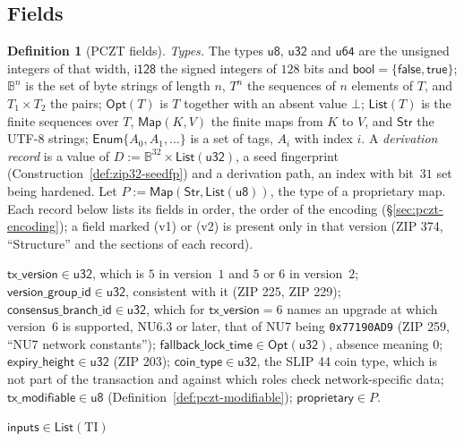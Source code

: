 \documentclass[11pt,a4paper]{article}
\theoremstyle{definition}
\newtheorem{definition}[theorem]{Definition}
\begin{document}
\subsection{Fields}\label{sec:pczt-fields}

\begin{definition}[PCZT fields]\label{def:pczt-fields}
\emph{Types.} The types $\mathsf{u8}$, $\mathsf{u32}$ and $\mathsf{u64}$
are the unsigned integers of that width, $\mathsf{i128}$ the signed
integers of $128$ bits and $\mathsf{bool} = \{\mathsf{false},
\mathsf{true}\}$; $\mathbb{B}^{n}$ is the set of byte strings of length $n$,
$T^{n}$ the sequences of $n$ elements of $T$, and $T_1 \times T_2$ the
pairs; $\mathsf{Opt}(T)$ is $T$ together with an absent value $\bot$;
$\mathsf{List}(T)$ is the finite sequences over $T$, $\mathsf{Map}(K, V)$
the finite maps from $K$ to $V$, and $\mathsf{Str}$ the UTF-8 strings;
$\mathsf{Enum}\{A_0, A_1, \dots\}$ is a set of tags, $A_i$ with index $i$. A
\emph{derivation record} is a value of $D := \mathbb{B}^{32} \times
\mathsf{List}(\mathsf{u32})$, a seed fingerprint
(Construction~\ref{def:zip32-seedfp}) and a derivation path, an index with
bit~$31$ set being hardened. Let $P := \mathsf{Map}(\mathsf{Str},
\mathsf{List}(\mathsf{u8}))$, the type of a proprietary map. Each record
below lists its fields in order, the order of the encoding
(\S\ref{sec:pczt-encoding}); a field marked (v1) or (v2) is present only in
that version (ZIP 374, ``Structure'' and the sections of each record).
{\raggedright
\begin{description}[leftmargin=0pt, itemsep=2pt]
\item[Global.] $\mathsf{tx\_version} \in \mathsf{u32}$, which is $5$ in
  version~$1$ and $5$ or $6$ in version~$2$;
  $\mathsf{version\_group\_id} \in \mathsf{u32}$, consistent with it (ZIP
  225, ZIP 229); $\mathsf{consensus\_branch\_id} \in \mathsf{u32}$, which
  for $\mathsf{tx\_version} = 6$ names an upgrade at which version~$6$ is
  supported, NU6.3 or later, that of NU7 being \texttt{0x77190AD9} (ZIP 259,
  ``NU7 network constants''); $\mathsf{fallback\_lock\_time} \in
  \mathsf{Opt}(\mathsf{u32})$, absence meaning $0$; $\mathsf{expiry\_height}
  \in \mathsf{u32}$ (ZIP 203); $\mathsf{coin\_type} \in \mathsf{u32}$, the
  SLIP 44 coin type, which is not part of the transaction and against which
  roles check network-specific data; $\mathsf{tx\_modifiable} \in
  \mathsf{u8}$ (Definition~\ref{def:pczt-modifiable}); $\mathsf{proprietary}
  \in P$.
\item[Transparent bundle.] $\mathsf{inputs} \in \mathsf{List}(\mathrm{TI})$

\end{description}}
\end{definition}
\end{document}
